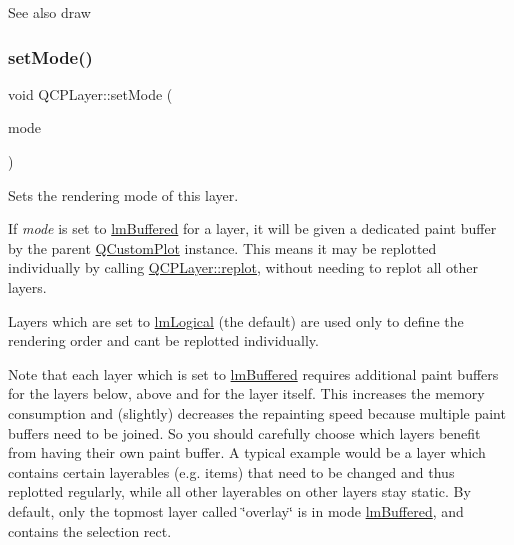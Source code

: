 \begin{DoxySeeAlso}{See also}
draw 
\end{DoxySeeAlso}
\mbox{\label{class_q_c_p_layer_a938d57b04f4e4c23cedf1711f983919b}} 
\subsubsection{\texorpdfstring{set\+Mode()}{setMode()}}
{\footnotesize\ttfamily void Q\+C\+P\+Layer\+::set\+Mode (\begin{DoxyParamCaption}\item[{\hyperlink{class_q_c_p_layer_a67dcfc1590be2a1f2227c5a39bb59c7c}{Q\+C\+P\+Layer\+::\+Layer\+Mode}}]{mode }\end{DoxyParamCaption})}

Sets the rendering mode of this layer.

If {\itshape mode} is set to \hyperlink{class_q_c_p_layer_a67dcfc1590be2a1f2227c5a39bb59c7cada274b1644a2a3c1b794c052f1601bb2}{lm\+Buffered} for a layer, it will be given a dedicated paint buffer by the parent \hyperlink{class_q_custom_plot}{Q\+Custom\+Plot} instance. This means it may be replotted individually by calling \hyperlink{class_q_c_p_layer_adefd53b6db02f470151c416f42e37180}{Q\+C\+P\+Layer\+::replot}, without needing to replot all other layers.

Layers which are set to \hyperlink{class_q_c_p_layer_a67dcfc1590be2a1f2227c5a39bb59c7ca6294b5ed9040aede762c626f5108f934}{lm\+Logical} (the default) are used only to define the rendering order and can\textquotesingle{}t be replotted individually.

Note that each layer which is set to \hyperlink{class_q_c_p_layer_a67dcfc1590be2a1f2227c5a39bb59c7cada274b1644a2a3c1b794c052f1601bb2}{lm\+Buffered} requires additional paint buffers for the layers below, above and for the layer itself. This increases the memory consumption and (slightly) decreases the repainting speed because multiple paint buffers need to be joined. So you should carefully choose which layers benefit from having their own paint buffer. A typical example would be a layer which contains certain layerables (e.\+g. items) that need to be changed and thus replotted regularly, while all other layerables on other layers stay static. By default, only the topmost layer called \char`\"{}overlay\char`\"{} is in mode \hyperlink{class_q_c_p_layer_a67dcfc1590be2a1f2227c5a39bb59c7cada274b1644a2a3c1b794c052f1601bb2}{lm\+Buffered}, and contains the selection rect.

